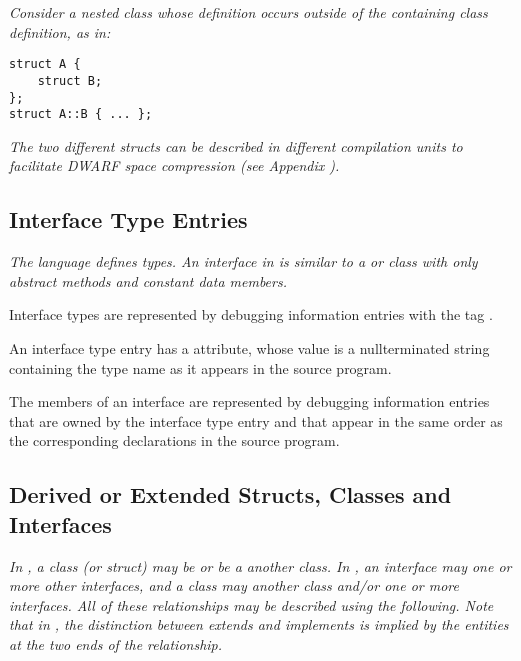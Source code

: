 \textit{Consider a nested class whose 
definition occurs outside of the containing class definition, as in:}

\begin{lstlisting}[numbers=none]
struct A {
    struct B;
};
struct A::B { ... };
\end{lstlisting}

\textit{The two different structs can be described in 
different compilation units to 
facilitate DWARF space compression 
(see Appendix ).}

\subsection{Interface Type Entries}
\label{chap:interfacetypeentries}

\textit{The  language defines  types. 
An interface
in  is similar to a  or 
 class with only abstract
methods and constant data members.}

Interface types 
are represented by debugging information
entries with the 
tag \DWTAGinterfacetypeTARG.

An interface type entry has 
a \DWATname{} attribute,
whose
value is a null\dash terminated string containing the type name
as it appears in the source program.

The members of an interface are represented by debugging
information entries that are owned by the interface type
entry and that appear in the same order as the corresponding
declarations in the source program.

\subsection{Derived or Extended Structs, Classes and Interfaces}
\label{chap:derivedorextendedstructsclasesandinterfaces}

\textit{In , a class (or struct) 
may 
be  or be a
 another class. 
In , an interface may 
one 
or more other interfaces, and a class may  another
class and/or  one or more interfaces. All of these
relationships may be described using the following. Note that
in , 
the distinction between extends and implements is
implied by the entities at the two ends of the relationship.}

